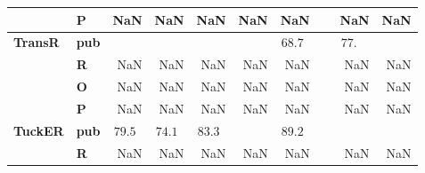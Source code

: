 \begin{tabular}{llrrrrrrr}
       & \textbf{P} &                NaN &                NaN &                NaN &         NaN &                NaN &                             NaN &      NaN \\\midrule
\textbf{TransR} & \textbf{pub} &                    &                    &                    &             &  $68.7\phantom{0}$ &  $\phantom{000}77.\phantom{00}$ &          \\
       & \textbf{R} &                NaN &                NaN &                NaN &         NaN &                NaN &                             NaN &      NaN \\
       & \textbf{O} &                NaN &                NaN &                NaN &         NaN &                NaN &                             NaN &      NaN \\
       & \textbf{P} &                NaN &                NaN &                NaN &         NaN &                NaN &                             NaN &      NaN \\\midrule
\textbf{TuckER} & \textbf{pub} &  $79.5\phantom{0}$ &  $74.1\phantom{0}$ &  $83.3\phantom{0}$ &             &  $89.2\phantom{0}$ &                                 &          \\
       & \textbf{R} &                NaN &                NaN &                NaN &         NaN &                NaN &                             NaN &      NaN \\
\bottomrule
\end{tabular}

